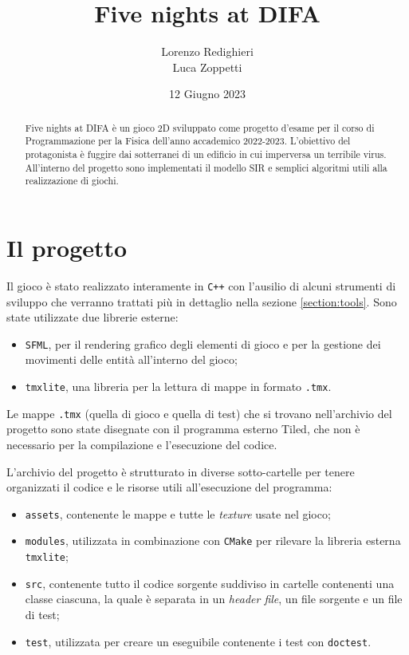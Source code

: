 \documentclass{article}
\title{Five nights at DIFA}
\author{Lorenzo Redighieri\\Luca Zoppetti}
\date{12 Giugno 2023}
\begin{document}
\maketitle

\begin{abstract}
    Five nights at DIFA è un gioco 2D sviluppato come progetto d'esame per il corso di Programmazione per la Fisica dell'anno accademico 2022-2023. L'obiettivo del protagonista è fuggire dai sotterranei di un edificio in cui imperversa un terribile virus. All'interno del progetto sono implementati il modello SIR e semplici algoritmi utili alla realizzazione di giochi.
\end{abstract}

\tableofcontents

\newpage

\section{Il progetto}
Il gioco è stato realizzato interamente in \verb|C++| con l'ausilio di alcuni strumenti di sviluppo che verranno trattati più in dettaglio nella sezione \ref{section:tools}. Sono state utilizzate due librerie esterne:
\begin{itemize}
    \item \verb|SFML|, per il rendering grafico degli elementi di gioco e per la gestione dei movimenti delle entità all'interno del gioco;
    \item \verb|tmxlite|, una libreria per la lettura di mappe in formato \verb|.tmx|.
\end{itemize}
Le mappe \verb|.tmx| (quella di gioco e quella di test) che si trovano nell'archivio del progetto sono state disegnate con il programma esterno Tiled, che non è necessario per la compilazione e l'esecuzione del codice.

L'archivio del progetto è strutturato in diverse sotto-cartelle per tenere organizzati il codice e le risorse utili all'esecuzione del programma:
\begin{itemize}
    \item \verb|assets|, contenente le mappe e tutte le \textit{texture} usate nel gioco;
    \item \verb|modules|, utilizzata in combinazione con \verb|CMake| per rilevare la libreria esterna \verb|tmxlite|;
    \item \verb|src|, contenente tutto il codice sorgente suddiviso in cartelle contenenti una classe ciascuna, la quale è separata in un \textit{header file}, un file sorgente e un file di test;
    \item \verb|test|, utilizzata per creare un eseguibile contenente i test con \verb|doctest|.
\end{itemize}
\end{document}
